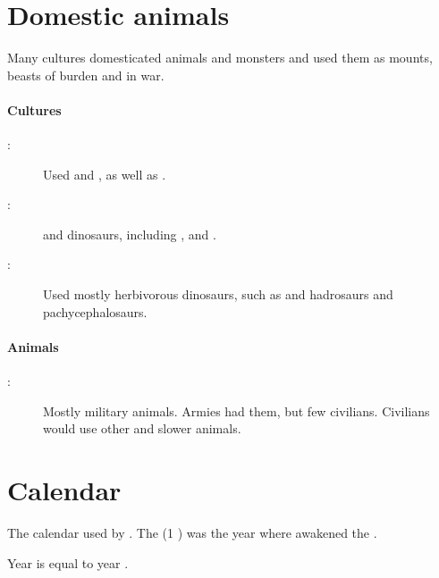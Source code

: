 \section{Domestic animals}
Many cultures domesticated animals and monsters and used them as mounts, beasts of burden and in war. 

\paragraph{Cultures}
\begin{description}
  \item[:] 
    Used  and , as well as . 
    
  \item[:] 
     and dinosaurs, including \lothae, \mezolisks and \corgoroth.
    
  \item[:]
    Used mostly herbivorous dinosaurs, such as  and hadrosaurs and pachycephalosaurs. 
\end{description}

\paragraph{Animals}
\begin{description}
 \item[:] 
    Mostly military animals.
    Armies had them, but few civilians. 
    Civilians would use other and slower animals.
\end{description}


















\section{\Draconian Calendar}
The calendar used by \dragons. 
The  (1 \DS) was the year where \Tiamat{} awakened the \xss. 

Year  is equal to year . 















